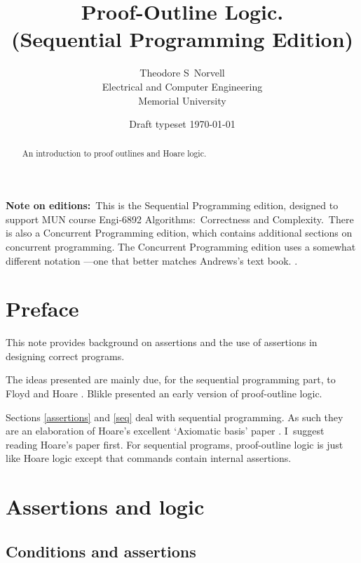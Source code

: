 \documentclass[11pt]{article}%
\begin{document}
\title{Proof-Outline Logic.\\(Sequential Programming Edition)}
\author{Theodore S\ Norvell\\Electrical and Computer Engineering\\Memorial University}
\date{Draft typeset
\today
}
\maketitle

\begin{abstract}
An introduction to proof outlines and Hoare logic.

\end{abstract}

\textbf{Note on editions:}\ This is the Sequential Programming edition,
designed to support MUN course Engi-6892 Algorithms:\ Correctness and
Complexity.\ There is also a Concurrent Programming edition, which contains
additional sections on concurrent programming. The Concurrent Programming
edition uses a somewhat different notation ---one that better matches Andrews's
text book. \cite{Andrews2000}.

\section{Preface}

This note provides background on assertions and the use of assertions in
designing correct programs.

The ideas presented are mainly due, for the sequential programming part, to
Floyd \cite{Floyd670} and Hoare \cite{Hoare690}. Blikle \cite{Blikle1979}
presented an early version of proof-outline logic.

Sections \ref{assertions} and \ref{seq} deal with sequential programming. As
such they are an elaboration of Hoare's excellent `Axiomatic basis' paper
\cite{Hoare690}. I\ suggest reading Hoare's paper first. For sequential
programs, proof-outline logic is just like Hoare logic except that commands
contain internal assertions.

\section{Assertions and logic\label{assertions}}

\subsection{Conditions and assertions}
\end{document}
